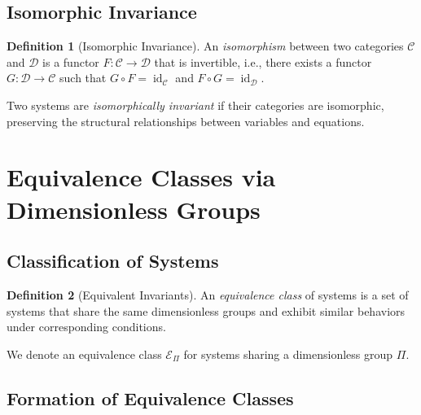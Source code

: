 \documentclass{article}
\theoremstyle{definition}
\newtheorem{definition}{Definition}[section]
\theoremstyle{remark}
\begin{document}
	\subsection{Isomorphic Invariance}
	
	\begin{definition}[Isomorphic Invariance]
		An \emph{isomorphism} between two categories $\mathcal{C}$ and $\mathcal{D}$ is a functor $F: \mathcal{C} \rightarrow \mathcal{D}$ that is invertible, i.e., there exists a functor $G: \mathcal{D} \rightarrow \mathcal{C}$ such that $G \circ F = \operatorname{id}_{\mathcal{C}}$ and $F \circ G = \operatorname{id}_{\mathcal{D}}$.
		
		Two systems are \emph{isomorphically invariant} if their categories are isomorphic, preserving the structural relationships between variables and equations.
	\end{definition}
	
	\section{Equivalence Classes via Dimensionless Groups}
	
	\subsection{Classification of Systems}
	
	\begin{definition}[Equivalent Invariants]
		An \emph{equivalence class} of systems is a set of systems that share the same dimensionless groups and exhibit similar behaviors under corresponding conditions.
		
		We denote an equivalence class $\mathcal{E}_\Pi$ for systems sharing a dimensionless group $\Pi$.
	\end{definition}
	
	\subsection{Formation of Equivalence Classes}
	
\end{document}
